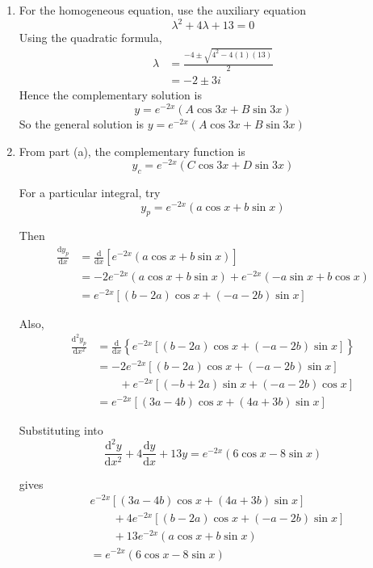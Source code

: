 \documentclass[leqno]{article}
\begin{document}
\begin{enumerate}[
  label=\textbf{\arabic*.},
  leftmargin=*,
  topsep=0pt,
  partopsep=0pt,
  parsep=0pt
]
\begin{tcolorbox}[colback=white, colframe=scarlet, title={\textbf{Solution}}, breakable, grow to left by=6mm, grow to right by=10mm]
\begin{enumerate}[label=\textbf{(\alph*)}]
  \item For the homogeneous equation, use the auxiliary equation
\[
\lambda^2+4\lambda+13=0
\]
Using the quadratic formula,
\begin{align*}
\lambda&=\frac{-4\pm\sqrt{4^2-4(1)(13)}}{2} \\[4pt]
&=-2\pm 3i
\end{align*}
Hence the complementary solution is
\[
y=e^{-2x}\left(A\cos 3x+B\sin 3x\right)
\]
So the general solution is $y=e^{-2x}\left(A\cos 3x+B\sin 3x\right)$ \\

  \item From part (a), the complementary function is
\[
y_c=e^{-2x}\left(C\cos 3x+D\sin 3x\right)
\]

For a particular integral, try
\[
y_p=e^{-2x}\left(a\cos x+b\sin x\right)
\]

Then
\begin{align*}
\frac{\mathrm{d}y_p}{\mathrm{d}x}
&= \frac{\mathrm{d}}{\mathrm{d}x}\left[e^{-2x}\left(a\cos x+b\sin x\right)\right] \\
&= -2e^{-2x}\left(a\cos x+b\sin x\right)
+e^{-2x}\left(-a\sin x+b\cos x\right) \\
&= e^{-2x}\left[(b-2a)\cos x+(-a-2b)\sin x\right]
\end{align*}

Also,
\begin{align*}
\frac{\mathrm{d}^2y_p}{\mathrm{d}x^2}
&= \frac{\mathrm{d}}{\mathrm{d}x}\left\{e^{-2x}\left[(b-2a)\cos x+(-a-2b)\sin x\right]\right\} \\
&= -2e^{-2x}\left[(b-2a)\cos x+(-a-2b)\sin x\right] \\
&\qquad +e^{-2x}\left[(-b+2a)\sin x+(-a-2b)\cos x\right] \\
&= e^{-2x}\left[(3a-4b)\cos x+(4a+3b)\sin x\right]
\end{align*}

Substituting into
\[
\frac{\mathrm{d}^2 y}{\mathrm{d}x^2}+4\frac{\mathrm{d}y}{\mathrm{d}x}+13y=e^{-2x}(6\cos x-8\sin x)
\]

gives
\begin{align*}
& e^{-2x}\left[(3a-4b)\cos x+(4a+3b)\sin x\right] \\
& \qquad +4e^{-2x}\left[(b-2a)\cos x+(-a-2b)\sin x\right] \\
& \qquad +13e^{-2x}\left(a\cos x+b\sin x\right) \\
&= e^{-2x}(6\cos x-8\sin x)
\end{align*}


\end{enumerate}
\end{tcolorbox}
\end{enumerate}
\end{document}

